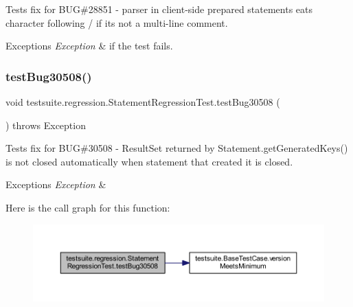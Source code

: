 Tests fix for B\+UG\#28851 -\/ parser in client-\/side prepared statements eats character following \textquotesingle{}/\textquotesingle{} if it\textquotesingle{}s not a multi-\/line comment.


\begin{DoxyExceptions}{Exceptions}
{\em Exception} & if the test fails. \\
\hline
\end{DoxyExceptions}
\mbox{\label{classtestsuite_1_1regression_1_1_statement_regression_test_a7cb27931fda37ceec6733fcd0e95ced5}} 
\subsubsection{\texorpdfstring{test\+Bug30508()}{testBug30508()}}
{\footnotesize\ttfamily void testsuite.\+regression.\+Statement\+Regression\+Test.\+test\+Bug30508 (\begin{DoxyParamCaption}{ }\end{DoxyParamCaption}) throws Exception}

Tests fix for B\+UG\#30508 -\/ Result\+Set returned by Statement.\+get\+Generated\+Keys() is not closed automatically when statement that created it is closed.


\begin{DoxyExceptions}{Exceptions}
{\em Exception} & \\
\hline
\end{DoxyExceptions}
Here is the call graph for this function\+:
\nopagebreak
\begin{figure}[H]
\begin{center}
\leavevmode
\includegraphics[width=350pt]{classtestsuite_1_1regression_1_1_statement_regression_test_a7cb27931fda37ceec6733fcd0e95ced5_cgraph}
\end{center}
\end{figure}
\mbox{\label{classtestsuite_1_1regression_1_1_statement_regression_test_a04e7c997d4e285f4538f897d61c1110e}} 
